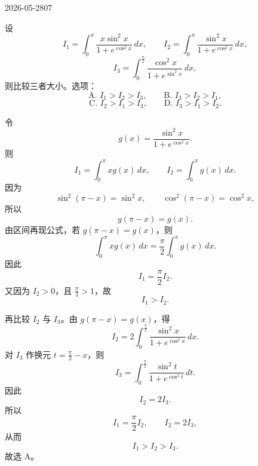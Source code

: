 \begin{mistake}{2026-05-28}{07}

\begin{problemcontent}
设
\[
I_1=\int_0^\pi \frac{x\sin^2 x}{1+e^{\cos^2 x}}\,dx,\qquad
I_2=\int_0^\pi \frac{\sin^2 x}{1+e^{\cos^2 x}}\,dx,
\]
\[
I_3=\int_0^{\frac{\pi}{2}}\frac{\cos^2 x}{1+e^{\sin^2 x}}\,dx,
\]
则比较三者大小。选项：
\[
\text{A. } I_1>I_2>I_3,\qquad
\text{B. } I_3>I_2>I_1,
\]
\[
\text{C. } I_2>I_1>I_3,\qquad
\text{D. } I_3>I_1>I_2.
\]
\end{problemcontent}

\begin{solutioncontent}
令
\[
g(x)=\frac{\sin^2 x}{1+e^{\cos^2 x}}.
\]
则
\[
I_1=\int_0^\pi xg(x)\,dx,\qquad I_2=\int_0^\pi g(x)\,dx.
\]
因为
\[
\sin^2(\pi-x)=\sin^2x,\qquad \cos^2(\pi-x)=\cos^2x,
\]
所以
\[
g(\pi-x)=g(x).
\]
由区间再现公式，若 \(g(\pi-x)=g(x)\)，则
\[
\int_0^\pi xg(x)\,dx=\frac{\pi}{2}\int_0^\pi g(x)\,dx.
\]
因此
\[
I_1=\frac{\pi}{2}I_2.
\]
又因为 \(I_2>0\)，且 \(\frac{\pi}{2}>1\)，故
\[
I_1>I_2.
\]

再比较 \(I_2\) 与 \(I_3\)。由 \(g(\pi-x)=g(x)\)，得
\[
I_2=2\int_0^{\frac{\pi}{2}}\frac{\sin^2x}{1+e^{\cos^2x}}\,dx.
\]
对 \(I_3\) 作换元 \(t=\frac{\pi}{2}-x\)，则
\[
I_3=\int_0^{\frac{\pi}{2}}\frac{\sin^2t}{1+e^{\cos^2t}}\,dt.
\]
因此
\[
I_2=2I_3.
\]
所以
\[
I_1=\frac{\pi}{2}I_2,\qquad I_2=2I_3,
\]
从而
\[
I_1>I_2>I_3.
\]
故选 \(\text{A}\)。
\end{solutioncontent}


\end{mistake}
